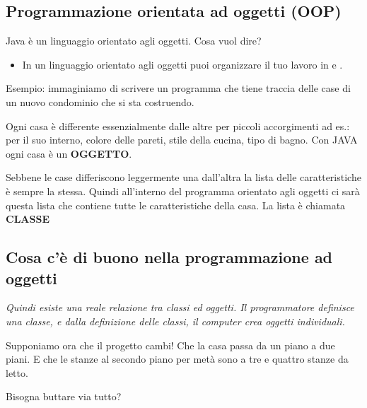 \subsection{Programmazione orientata ad oggetti (OOP)}
\begin{frame}
\begin{block}{}
Java è un linguaggio orientato agli oggetti. Cosa vuol dire?
\end{block}
\begin{itemize}
\item In un linguaggio orientato agli oggetti puoi organizzare il tuo lavoro in  e .
\end{itemize}
Esempio: immaginiamo di scrivere un programma che tiene traccia delle case di un nuovo condominio che si sta costruendo.
\begin{block}{}
Ogni casa è differente essenzialmente dalle altre per piccoli accorgimenti ad es.: per il suo interno, colore delle pareti, stile della cucina, tipo di bagno. Con JAVA ogni casa è un \textbf{\alert{OGGETTO}}.
\end{block}
\begin{block}{}
Sebbene le case differiscono leggermente una dall'altra la lista delle caratteristiche è sempre la stessa. Quindi 
all'interno del programma orientato agli oggetti ci sarà questa lista che contiene tutte le caratteristiche
della casa. La lista è chiamata \textbf{\alert{CLASSE}}
\end{block}
\end{frame}

\subsection*{Cosa c'è di buono nella programmazione ad oggetti}
\begin{frame}
\begin{block}{}
\begin{center}
\itshape{Quindi esiste una reale relazione tra classi ed oggetti. Il programmatore definisce una classe, e dalla definizione
delle classi, il computer crea oggetti individuali.}
\end{center}
\end{block}
\pause
\begin{block}{}
Supponiamo ora che il progetto cambi! Che la casa passa da un piano a due piani. E che le stanze al secondo piano per metà sono 
a tre e quattro stanze da letto.
\end{block}
\pause
\begin{block}{}
Bisogna buttare via tutto?
\end{block}
\end{frame}